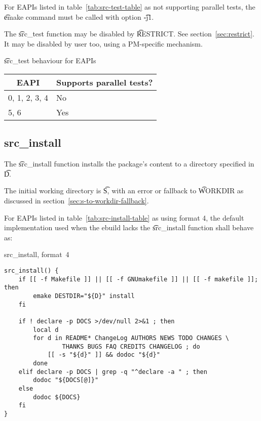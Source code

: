  For EAPIs listed in table~\ref{tab:src-test-table} as not supporting
parallel tests, the \t{emake} command must be called with option \t{-j1}.

The \t{src\_test} function may be disabled by \t{RESTRICT}\@. See section~\ref{sec:restrict}. It may
be disabled by user too, using a PM-specific mechanism.

\begin{centertable}{\t{src\_test} behaviour for EAPIs}
    \label{tab:src-test-table}
    \begin{tabular}{ll}
      \toprule
      \multicolumn{1}{c}{\textbf{EAPI}} &
      \multicolumn{1}{c}{\textbf{Supports parallel tests?}} \\
      \midrule
      0, 1, 2, 3, 4     & No  \\
      5, 6              & Yes \\
      \bottomrule
    \end{tabular}
\end{centertable}

\subsection{src\_install}

 The \t{src\_install} function installs the package's content to a
directory specified in \t{D}.

The initial working directory is \t{S}, with an error or fallback to \t{WORKDIR} as discussed in
section~\ref{sec:s-to-workdir-fallback}.

 For EAPIs listed in table~\ref{tab:src-install-table} as using format
4, the default implementation used when the ebuild lacks the \t{src\_install} function shall behave
as:

\begin{listing}[H]
\caption{src\_install, format~4}
\begin{verbatim}
src_install() {
    if [[ -f Makefile ]] || [[ -f GNUmakefile ]] || [[ -f makefile ]]; then
        emake DESTDIR="${D}" install
    fi

    if ! declare -p DOCS >/dev/null 2>&1 ; then
        local d
        for d in README* ChangeLog AUTHORS NEWS TODO CHANGES \
                THANKS BUGS FAQ CREDITS CHANGELOG ; do
            [[ -s "${d}" ]] && dodoc "${d}"
        done
    elif declare -p DOCS | grep -q "^declare -a " ; then
        dodoc "${DOCS[@]}"
    else
        dodoc ${DOCS}
    fi
}
\end{verbatim}
\end{listing}

